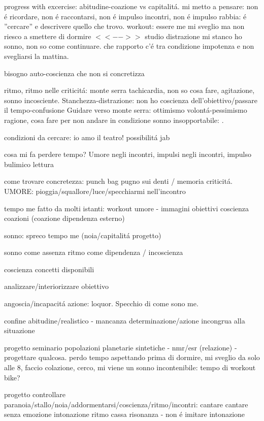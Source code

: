 progress with excercise: abitudine-coazione vs capitalit\'a.
mi metto a pensare: non \'e ricordare, non \'e raccontarsi, non \'e impulso incontri, non \'e impulso rabbia: \'e ''cercare'' e descrivere quello che trovo.
workout: essere me mi sveglio ma non riesco a smettere di dormire $<<-->>$ studio distrazione mi stanco ho sonno, non so come continuare.
che rapporto c'\'e tra condizione impotenza e non svegliarsi la mattina.

bisogno auto-coscienza che non si concretizza

ritmo, ritmo nelle criticit\'a: monte serra tachicardia, non so cosa fare, agitazione, sonno incosciente.
Stanchezza-distrazione: non ho coscienza dell'obiettivo/passare il tempo-confusione
Guidare verso monte serra: ottimismo volont\'a-pessimismo ragione, cosa fare per non andare in condizione sonno insopportabile: .

condizioni da cercare: io amo il teatro!
possibilit\'a jab

cosa mi fa perdere tempo? Umore negli incontri, impulsi negli incontri, impulso bulimico lettura

come trovare concretezza: punch bag pugno sui denti / memoria criticit\'a.
UMORE: pioggia/squallore/luce/specchiarmi nell'incontro

tempo me fatto da molti istanti: workout umore - immagini obiettivi coscienza coazioni (coazione dipendenza esterno)

sonno: spreco tempo me (noia/capitalit\'a progetto)

sonno come assenza ritmo come dipendenza / incoscienza

coscienza concetti disponibili

analizzare/interiorizzare obiettivo

angoscia/incapacit\'a azione: loquor. Specchio di come sono me.

confine abitudine/realistico  - mancanza determinazione/azione incongrua alla situazione

progetto seminario popolazioni planetarie sintetiche - nmr/esr (relazione) - progettare qualcosa.
perdo tempo aspettando prima di dormire, mi sveglio da solo alle 8, faccio colazione, cerco, mi viene un sonno incontenibile: tempo di workout bike?

progetto controllare paranoia/stallo/noia/addormentarsi/coscienza/ritmo/incontri: cantare cantare senza emozione intonazione ritmo cassa risonanza - non \'e imitare intonazione


